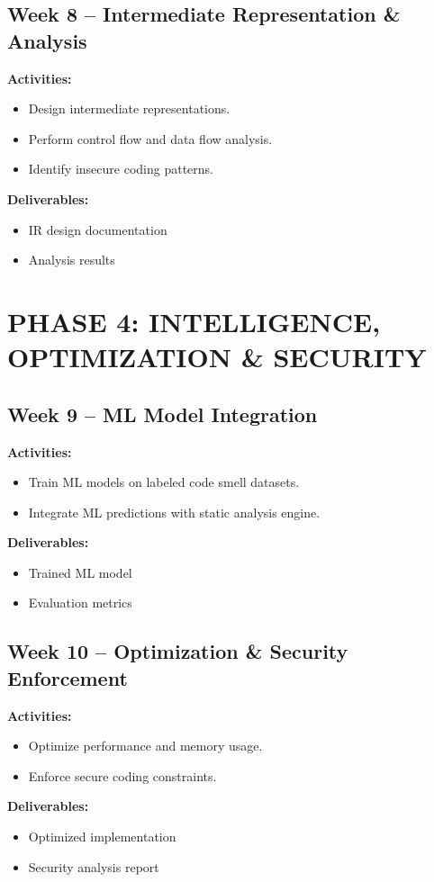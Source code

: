 \documentclass[12pt,a4paper]{article}
\begin{document}
\subsection*{Week 8 -- Intermediate Representation \& Analysis}
\textbf{Activities:}
\begin{itemize}[noitemsep]
    \item Design intermediate representations.
    \item Perform control flow and data flow analysis.
    \item Identify insecure coding patterns.
\end{itemize}
\textbf{Deliverables:}
\begin{itemize}[noitemsep]
    \item IR design documentation
    \item Analysis results
\end{itemize}

\section*{PHASE 4: INTELLIGENCE, OPTIMIZATION \& SECURITY}

\subsection*{Week 9 -- ML Model Integration}
\textbf{Activities:}
\begin{itemize}[noitemsep]
    \item Train ML models on labeled code smell datasets.
    \item Integrate ML predictions with static analysis engine.
\end{itemize}
\textbf{Deliverables:}
\begin{itemize}[noitemsep]
    \item Trained ML model
    \item Evaluation metrics
\end{itemize}

\subsection*{Week 10 -- Optimization \& Security Enforcement}
\textbf{Activities:}
\begin{itemize}[noitemsep]
    \item Optimize performance and memory usage.
    \item Enforce secure coding constraints.
\end{itemize}
\textbf{Deliverables:}
\begin{itemize}[noitemsep]
    \item Optimized implementation
    \item Security analysis report
\end{itemize}
\end{document}
